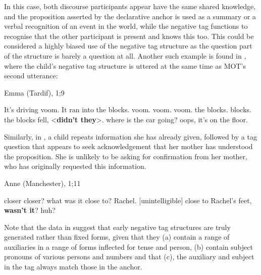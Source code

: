 \documentclass[output=paper,colorlinks,citecolor=brown]{langscibook}
\begin{document}
In this case, both discourse participants appear have the same shared knowledge, and the proposition asserted by the declarative anchor is used as a summary or a verbal recognition of an event in the world, while the negative tag functions to recognise that the other participant is present and knows this too. This could be considered a highly biased use of the negative tag structure as the question part of the structure is barely a question at all. Another such example is found in , where the child's negative tag structure is uttered at the same time as MOT's second utterance:

\begin{exe}
\ex Emma (Tardif), 1;9 	\label{3:blocks}
\begin{xlist} 
	It's driving
	voom. It ran into the blocks. voom. voom.
	voom. the blocks. blocks. the blocks fell, <\textbf{didn't they}>.
	where is the car going? oops, it's on the floor. 
\end{xlist}
\end{exe}

Similarly, in , a child repeats information she has already given, followed by a tag question that appears to seek acknowledgement that her mother has understood the proposition. She is unlikely to be asking for confirmation from her mother, who has originally requested this information.

\begin{exe}
\ex Anne (Manchester), 1;11 \label{3:feet}
\begin{xlist}
 closer
 closer? what was it close to?
 Rachel.
 $[$unintelligible$]$
 close to Rachel's feet, \textbf{wasn't it}?
 huh?	
\end{xlist}
\end{exe}

Note that the data in  suggest that early negative tag structures are truly generated rather than fixed forms, given that they (a) contain a range of auxiliaries in a range of forms inflected for tense and person, (b) contain subject pronouns of various persons and numbers and that (c), the auxiliary and subject in the tag always match those in the anchor.
\end{document}
